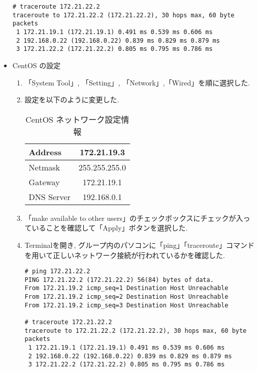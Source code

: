 \documentclass[a4j,titlepage]{jarticle}
\begin{document}
\begin{itemize}
\begin{center}
  \begin{screen}
\begin{verbatim}
# traceroute 172.21.22.2
traceroute to 172.21.22.2 (172.21.22.2), 30 hops max, 60 byte packets
 1 172.21.19.1 (172.21.19.1) 0.491 ms 0.539 ms 0.606 ms
 2 192.168.0.22 (192.168.0.22) 0.839 ms 0.829 ms 0.879 ms
 3 172.21.22.2 (172.21.22.2) 0.805 ms 0.795 ms 0.786 ms 
\end{verbatim}
  \end{screen}
\end{center}

\item CentOS の設定\\
\begin{enumerate}
\item 「System Tool」, 「Setting」, 「Network」,「Wired」を順に選択した.
\item 設定を以下のように変更した.
  \begin{table}[htbp]
\caption{CentOS ネットワーク設定情報}
\label{tab:linuxinstall}
\begin{center}
\begin{tabular}{|l||c|}
\hline
Address & 172.21.19.3\\ \hline
Netmask & 255.255.255.0\\ \hline
Gateway & 172.21.19.1\\ \hline
DNS Server & 192.168.0.1 \\ \hline
\end{tabular}
\end{center}
\end{table}
\item 「make available to other users」のチェックボックスにチェックが入っていることを確認して「Apply」ボタンを選択した.
\item Terminalを開き, グループ内のパソコンに「ping」「traceroute」コマンドを用いて正しいネットワーク接続が行われているかを確認した.
  \begin{center}
  \begin{screen}
\begin{verbatim}
# ping 172.21.22.2
PING 172.21.22.2 (172.21.22.2) 56(84) bytes of data.
From 172.21.19.2 icmp_seq=1 Destination Host Unreachable
From 172.21.19.2 icmp_seq=2 Destination Host Unreachable
From 172.21.19.2 icmp_seq=3 Destination Host Unreachable

# traceroute 172.21.22.2
traceroute to 172.21.22.2 (172.21.22.2), 30 hops max, 60 byte packets
 1 172.21.19.1 (172.21.19.1) 0.491 ms 0.539 ms 0.606 ms
 2 192.168.0.22 (192.168.0.22) 0.839 ms 0.829 ms 0.879 ms
 3 172.21.22.2 (172.21.22.2) 0.805 ms 0.795 ms 0.786 ms 
\end{verbatim}
  \end{screen}
\end{center}
\end{enumerate}


\end{itemize}
\end{document}
